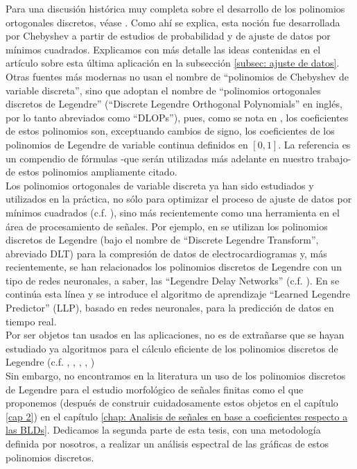 Para una discusión histórica muy completa
sobre el desarrollo de los polinomios
ortogonales discretos,
véase \cite{roy}. Como ahí se explica, esta
noción fue desarrollada por Chebyshev a partir
de estudios de probabilidad y de ajuste de datos
por mínimos cuadrados. Explicamos con más detalle las ideas
contenidas en el artículo \cite{george}
sobre esta última aplicación en
la subsección \eqref{subsec: ajuste de datos}. \\

Otras fuentes más modernas no usan el nombre de 
``polinomios de Chebyshev de variable discreta'', sino que
adoptan el nombre de ``polinomios ortogonales discretos de Legendre''
(``Discrete Legendre
Orthogonal Polynomials'' en inglés, por lo tanto abreviados
como ``DLOPs''), pues, como se nota en 
\cite{Neuman}, los coeficientes de estos polinomios son,
exceptuando cambios de signo, 
los coeficientes de los polinomios de Legendre de variable
continua definidos en $[0,1]$.
La referencia \cite{Neuman} es un compendio de fórmulas
-que serán utilizadas más adelante en nuestro trabajo-
de estos polinomios ampliamente citado. \\


Los polinomios ortogonales de variable discreta
ya han sido estudiados y utilizados en la práctica,
no sólo para optimizar el proceso de ajuste de
datos por mínimos cuadrados 
(c.f. \cite{george}), sino más recientemente como 
una herramienta en el área de procesamiento de señales.
Por ejemplo, en 
\cite{colomer}
se utilizan los polinomios
discretos de Legendre
(bajo el nombre de
``Discrete Legendre Transform'', abreviado DLT) 
para la compresión de datos de electrocardiogramas
y, más recientemente, se han
relacionados los polinomios discretos de Legendre 
con un tipo de redes neuronales, a
saber, las ``Legendre Delay Networks''
(c.f. \cite{stockel}).
En \cite{furlong} se continúa esta línea y 
se introduce el algoritmo de aprendizaje ``Learned Legendre Predictor'' (LLP),
basado en redes neuronales, para la predicción de datos en tiempo real. \\

Por ser objetos tan usados en las aplicaciones, no es de
extrañarse que se hayan estudiado ya
algoritmos para el cálculo eficiente
de los polinomios discretos de Legendre
(c.f. \cite{Neuman}, \cite{abur}, \cite{abur2}, \cite{dris}, \cite{mukun}) \\


Sin embargo,
no encontramos en la literatura
un uso de los polinomios discretos
de Legendre para el estudio morfológico de señales finitas
como el que proponemos (después de construir cuidadosamente
estos objetos en el capítulo \ref{cap 2})
en el capítulo 
\ref{chap: Analisis de señales en base a coeficientes respecto a las BLDs}.
Dedicamos la segunda parte de esta tesis, con una metodología 
definida por nosotros, a realizar un análisis espectral de las gráficas
de estos polinomios discretos.
